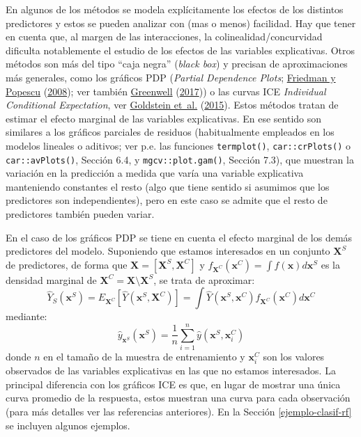 \documentclass[
  spanish,
]{book}
\theoremstyle{break}
\theoremstyle{definition}
\theoremstyle{definition}
\theoremstyle{definition}
\theoremstyle{definition}
\theoremstyle{remark}
\begin{document}
En algunos de los métodos se modela explícitamente los efectos de los distintos predictores y estos se pueden analizar con (mas o menos) facilidad.
Hay que tener en cuenta que, al margen de las interacciones, la colinealidad/concurvidad dificulta notablemente el estudio de los efectos de las variables explicativas.
Otros métodos son más del tipo ``caja negra'' (\emph{black box}) y precisan de aproximaciones más generales, como los gráficos PDP (\emph{Partial Dependence Plots}; \protect\hyperlink{ref-friedman2008predictive}{Friedman y Popescu} (\protect\hyperlink{ref-friedman2008predictive}{2008}); ver también \protect\hyperlink{ref-greenwell2020dblp}{Greenwell} (\protect\hyperlink{ref-greenwell2020dblp}{2017})) o las curvas ICE \emph{Individual Conditional Expectation}, ver \protect\hyperlink{ref-goldstein2015peeking}{Goldstein et~al.} (\protect\hyperlink{ref-goldstein2015peeking}{2015}).
Estos métodos tratan de estimar el efecto marginal de las variables explicativas.
En ese sentido son similares a los gráficos parciales de residuos (habitualmente empleados en los modelos lineales o aditivos; ver p.e. las funciones \texttt{termplot()}, \texttt{car::crPlots()} o \texttt{car::avPlots()}, Sección 6.4, y \texttt{mgcv::plot.gam()}, Sección 7.3), que muestran la variación en la predicción a medida que varía una variable explicativa manteniendo constantes el resto (algo que tiene sentido si asumimos que los predictores son independientes), pero en este caso se admite que el resto de predictores también pueden variar.

En el caso de los gráficos PDP se tiene en cuenta el efecto marginal de los demás predictores del modelo.
Suponiendo que estamos interesados en un conjunto \(\mathbf X^S\) de predictores, de forma que \(\mathbf X = [\mathbf X^S, \mathbf X^C]\) y \(f_{\mathbf X^C}(\mathbf x^C) = \int f(\mathbf x) d\mathbf x^S\) es la densidad marginal de \(\mathbf X^C = \mathbf X \setminus \mathbf X^S\), se trata de aproximar:
\[\hat Y_S(\mathbf x^S) = E_{\mathbf X^C}\left[\hat{Y}(\mathbf x^S,\mathbf X^C)\right]=\int\hat{Y}(\mathbf x^S,\mathbf x^C)f_{\mathbf X^C}(\mathbf x^C)d\mathbf x^C\]
mediante:
\[\hat{y}_{\mathbf x^S}(\mathbf x^S)=\frac{1}{n}\sum_{i=1}^n\hat{y}(\mathbf x^S, \mathbf x^C_i)\]
donde \(n\) en el tamaño de la muestra de entrenamiento y \(\mathbf x^C_i\) son los valores observados de las variables explicativas en las que no estamos interesados.
La principal diferencia con los gráficos ICE es que, en lugar de mostrar una única curva promedio de la respuesta, estos muestran una curva para cada observación (para más detalles ver las referencias anteriores).
En la Sección \ref{ejemplo-clasif-rf} se incluyen algunos ejemplos.
\end{document}

